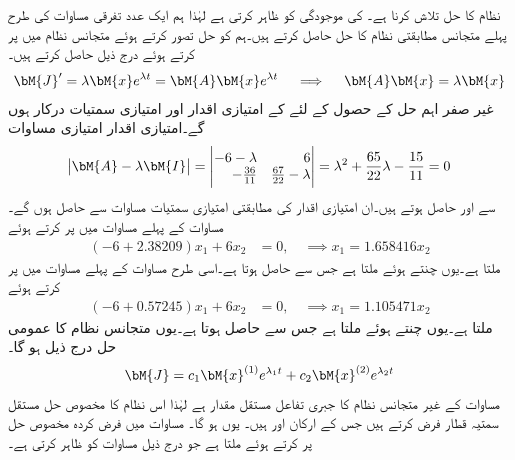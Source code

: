  نظام کا حل تلاش کرنا ہے۔ کی موجودگی   کو ظاہر کرتی ہے لہٰذا ہم ایک عدد تفرقی مساوات کی طرح پہلے متجانس مطابقتی نظام  کا حل حاصل کرتے ہیں۔ہم  کو حل تصور کرتے ہوئے متجانس نظام میں پر کرتے ہوئے درج ذیل حاصل کرتے ہیں۔
\begin{align*}
\bM{J}'=\lambda \bM{x}e^{\lambda t}=\bM{A}\bM{x}e^{\lambda t} \quad \implies \quad \bM{A}\bM{x}=\lambda \bM{x}
\end{align*}
غیر صفر اہم حل کے حصول کے لئے  کے امتیازی اقدار اور امتیازی سمتیات درکار ہوں گے۔امتیازی اقدار امتیازی مساوات
\begin{align*}
\abs{\bM{A}-\lambda \bM{I}}=\begin{vmatrix*}[r] -6-\lambda& 6 \\-\frac{36}{11}&\frac{67}{22}-\lambda \end{vmatrix*}=\lambda^2+\frac{65}{22}\lambda-\frac{15}{11}=0
\end{align*}
سے  اور  حاصل ہوتے ہیں۔ان امتیازی اقدار کی مطابقتی امتیازی سمتیات مساوات  سے حاصل ہوں گے۔مساوات  کے پہلے مساوات میں   پر کرتے ہوئے 
\begin{align*}
(-6+2.38209)x_1+6x_2&=0,\quad \implies x_1=1.658416x_2
\end{align*}
ملتا ہے۔یوں  چنتے ہوئے  ملتا ہے جس سے  حاصل ہوتا ہے۔اسی طرح مساوات  کے پہلے مساوات میں   پر کرتے ہوئے 
\begin{align*}
(-6+0.57245)x_1+6x_2&=0,\quad \implies x_1=1.105471x_2
\end{align*}
ملتا ہے۔یوں  چنتے ہوئے  ملتا ہے جس سے  حاصل ہوتا ہے۔یوں متجانس نظام کا عمومی حل درج ذیل ہو گا۔
\begin{align}
\bM{J}=c_1\bM{x}^{(1)}e^{\lambda_1 t}+c_2 \bM{x}^{(2)}e^{\lambda_2 t}
\end{align}
مساوات  کے غیر متجانس نظام کا جبری تفاعل  مستقل مقدار ہے لہٰذا اس نظام کا مخصوص حل  مستقل سمتیہ قطار  فرض کرتے ہیں جس کے ارکان  اور  ہیں۔ یوں  ہو گا۔ مساوات  میں فرض کردہ مخصوص حل پر کرتے ہوئے   ملتا ہے جو درج ذیل  مساوات کو ظاہر کرتی ہے۔
